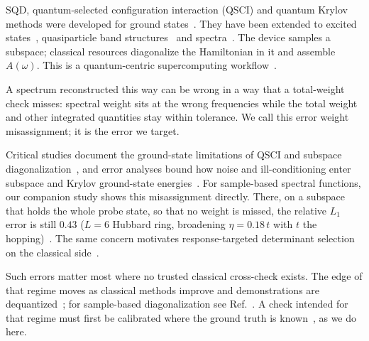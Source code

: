 \documentclass[submission, PhysCore]{SciPost}
\begin{document}
SQD, quantum-selected configuration interaction (QSCI) and quantum Krylov methods were developed for ground states~\cite{QSCI2023,SQDchem2025,SKQD2501,Yoshioka2025,Motta2020}. They have been extended to excited states~\cite{Barison2024}, quasiparticle band structures~\cite{Ohgoe2025} and spectra~\cite{SQDspec2608,Patel2026}. The device samples a subspace; classical resources diagonalize the Hamiltonian in it and assemble $A(\omega)$. This is a quantum-centric supercomputing workflow~\cite{SQDchem2025,Alexeev2024}.

A spectrum reconstructed this way can be wrong in a way that a total-weight check misses: spectral weight sits at the wrong frequencies while the total weight and other integrated quantities stay within tolerance. We call this error weight misassignment; it is the error we target.

Critical studies document the ground-state limitations of QSCI and subspace diagonalization~\cite{Reinholdt2025,GaberleJattana2026,VaqueroSabater2026}, and error analyses bound how noise and ill-conditioning enter subspace and Krylov ground-state energies~\cite{Epperly2022,Kirby2024}. For sample-based spectral functions, our companion study shows this misassignment directly. There, on a subspace that holds the whole probe state, so that no weight is missed, the relative $L_1$ error is still $0.43$ ($L=6$ Hubbard ring, broadening $\eta=0.18\,t$ with $t$ the hopping)~\cite{SQDspec2608}. The same concern motivates response-targeted determinant selection on the classical side~\cite{LRSCI2025}.

Such errors matter most where no trusted classical cross-check exists. The edge of that regime moves as classical methods improve and demonstrations are dequantized~\cite{Preskill2018,Daley2022,Kim2023,Tindall2024,Tang2019,Hangleiter2023}; for sample-based diagonalization see Ref.~\cite{BonillaReviewSQD2026}. A check intended for that regime must first be calibrated where the ground truth is known~\mbox{\cite{Eisert2020,Carrasco2021,Elben2020,Lubinski2023,Flammia2011}}, as we do here.
\end{document}
